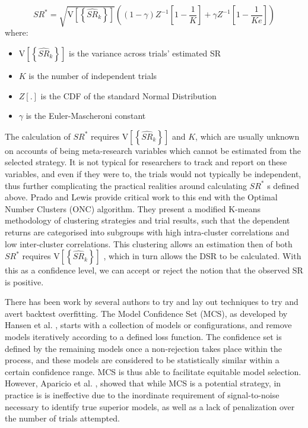 \documentclass[a4paper,11pt,oneside]{article}
\theoremstyle{plain}
\theoremstyle{definition}
\begin{document}
\begin{equation}
SR^{*}=\sqrt{\mathrm{V}\left[\left\{\widehat{S R}_{k}\right\}\right]}\left((1-\gamma) Z^{-1}\left[1-\frac{1}{K}\right]+\gamma Z^{-1}\left[1-\frac{1}{K e}\right]\right)
\end{equation}
where:
\begin{itemize}
	\item [] $\mathrm{V}\left[\left\{\widehat{S R}_{k}\right\}\right]$ is the variance across trials' estimated SR
	\item [] $K$ is the number of independent trials
	\item [] $Z[.]$ is the CDF of the standard Normal Distribution 
	\item [] $\gamma$ is the Euler-Mascheroni constant
\end{itemize}

The calculation of $SR^{*}$ requires $\mathrm{V}\left[\left\{\widehat{S R}_{k}\right\}\right]$ and  $K$, which are usually unknown on accounts of being meta-research variables which cannot be estimated from the selected strategy. It is not typical for researchers to track and report on these variables, and even if they were to, the trials would not typically be independent, thus further complicating the practical realities around calculating $SR^{*}$ s defined above. Prado and Lewis  provide critical work to this end with the Optimal Number Clusters (ONC) algorithm. They present a modified K-means methodology of clustering strategies and trial results, such that the dependent returns are categorised into subgroups with high intra-cluster correlations and low inter-cluster correlations. This clustering allows an estimation then of both  $SR^{*}$ requires $\mathrm{V}\left[\left\{\widehat{S R}_{k}\right\}\right]$ , which in turn allows the DSR to be calculated. With this as a confidence level, we can accept or reject the notion that the observed SR is positive.


There has been work by several authors to try and lay out techniques to try and avert backtest overfitting. 
The Model Confidence Set (MCS), as developed by Hansen et al. \cite{Hansen}, starts with a 
collection of models or configurations, and remove models iteratively according to a defined loss function. 
The confidence set is defined by the remaining models once a non-rejection takes place within the process, and 
these models are considered to be statistically similar within a certain confidence range. MCS is thus able to facilitate 
equitable model selection. However, Aparicio et al. \cite{Aparicio}, showed  that while MCS is a potential strategy, in 
practice is is ineffective due to the inordinate requirement of signal-to-noise necessary to identify true superior 
models, as well as a lack of penalization over the number of trials attempted.
\hfill \break
\end{document}
